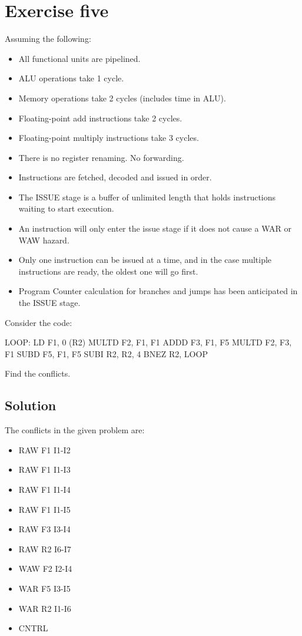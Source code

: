 \section{Exercise five}

Assuming the following:
\begin{itemize}
    \item All functional units are pipelined.
    \item ALU operations take 1 cycle.
    \item Memory operations take 2 cycles (includes time in ALU).
    \item Floating-point add instructions take 2 cycles.
    \item Floating-point multiply instructions take 3 cycles.
    \item There is no register renaming. No forwarding.
    \item Instructions are fetched, decoded and issued in order.
    \item The ISSUE stage is a buffer of unlimited length that holds instructions waiting to start execution.
    \item An instruction will only enter the issue stage if it does not cause a WAR or WAW hazard.
    \item Only one instruction can be issued at a time, and in the case multiple instructions are ready, the oldest one will go first.
    \item Program Counter calculation for branches and jumps has been anticipated in the ISSUE stage.
\end{itemize}
Consider the code:
\begin{verbnobox}[\verbarg]
LOOP:   LD F1, 0 (R2)
        MULTD F2, F1, F1
        ADDD F3, F1, F5
        MULTD F2, F3, F1
        SUBD F5, F1, F5
        SUBI R2, R2, 4
        BNEZ R2, LOOP
\end{verbnobox}
Find the conflicts.

\subsection*{Solution}
The conflicts in the given problem are: 
\begin{itemize}
    \item RAW F1 I1-I2
    \item RAW F1 I1-I3
    \item RAW F1 I1-I4
    \item RAW F1 I1-I5
    \item RAW F3 I3-I4
    \item RAW R2 I6-I7
    \item WAW F2 I2-I4
    \item WAR F5 I3-I5
    \item WAR R2 I1-I6
    \item CNTRL
\end{itemize}